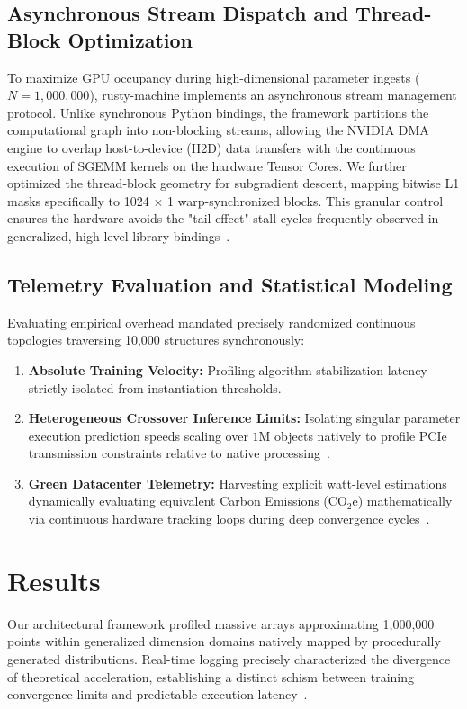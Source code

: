 \documentclass[conference]{IEEEtran}
\begin{document}
\subsection{Asynchronous Stream Dispatch and Thread-Block Optimization}
To maximize GPU occupancy during high-dimensional parameter ingests ($N=1,000,000$), rusty-machine implements an asynchronous stream management protocol. Unlike synchronous Python bindings, the framework partitions the computational graph into non-blocking streams, allowing the NVIDIA DMA engine to overlap host-to-device (H2D) data transfers with the continuous execution of SGEMM kernels on the hardware Tensor Cores. We further optimized the thread-block geometry for subgradient descent, mapping bitwise L1 masks specifically to 1024 $\times$ 1 warp-synchronized blocks. This granular control ensures the hardware avoids the "tail-effect" stall cycles frequently observed in generalized, high-level library bindings~\cite{ref11,ref12}.

\subsection{Telemetry Evaluation and Statistical Modeling}
Evaluating empirical overhead mandated precisely randomized continuous topologies traversing 10,000 structures synchronously:
\begin{enumerate}
    \item \textbf{Absolute Training Velocity:} Profiling algorithm stabilization latency strictly isolated from instantiation thresholds. 
    \item \textbf{Heterogeneous Crossover Inference Limits:} Isolating singular parameter execution prediction speeds scaling over $1$M objects natively to profile PCIe transmission constraints relative to native processing~\cite{ref1,ref2}.
    \item \textbf{Green Datacenter Telemetry:} Harvesting explicit watt-level estimations dynamically evaluating equivalent Carbon Emissions (CO$_2$e) mathematically via continuous hardware tracking loops during deep convergence cycles~\cite{ref11}.
\end{enumerate}

\section{Results}
\label{sec:results}
Our architectural framework profiled massive arrays approximating 1,000,000 points within generalized dimension domains natively mapped by procedurally generated distributions. Real-time logging precisely characterized the divergence of theoretical acceleration, establishing a distinct schism between training convergence limits and predictable execution latency~\cite{ref11,ref12}.
\end{document}
